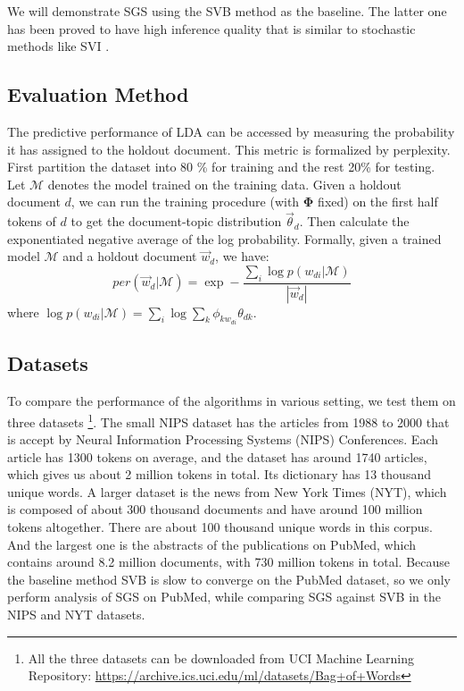 \documentclass{article} %
\begin{document}
We will demonstrate SGS using the SVB method \cite{broderick2013streaming} as the baseline. The latter one has been proved to have high inference quality that is similar to stochastic methods like SVI \cite{hoffman2013stochastic}. 

\subsection{Evaluation Method}
The predictive performance of LDA can be accessed by measuring the probability it has assigned to the holdout document. This metric is formalized by perplexity. First partition the dataset into 80 \% for training and the rest 20\% for testing. Let $\mathcal{M}$ denotes the model trained on the training data. Given a holdout document $d$, we can run the training procedure (with $\bm{\Phi}$ fixed) on the first half tokens of $d$ to get the document-topic distribution $\vec{\theta}_d$. Then calculate the exponentiated negative average of the log probability. Formally, given a trained model $\mathcal{M}$ and a holdout document $\vec{w}_{d}$, we have:
$$per(\vec{w}_{d}|\mathcal{M})=\exp-\frac{\sum_i \log p(w_{di}|\mathcal{M})}{|\vec{w}_{d}|}$$
where $\log p(w_{di}|\mathcal{M})=\sum_i \log {\sum_k \phi_{kw_{di}}\theta_{dk}}$. 

\subsection{Datasets}
To compare the performance of the algorithms in various setting, we test them on three datasets \footnote{All the three datasets can be downloaded from UCI Machine Learning Repository: \url{https://archive.ics.uci.edu/ml/datasets/Bag+of+Words}}. The small NIPS dataset \cite{pereiraeuclidean} has the articles from 1988 to 2000 that is accept by Neural Information Processing Systems (NIPS) Conferences. Each article has 1300 tokens on average, and the dataset has around 1740 articles, which gives us about 2 million tokens in total. Its dictionary has 13 thousand unique words. A larger dataset is the news from New York Times (NYT), which is composed of about 300 thousand documents and have around 100 million tokens altogether. There are about 100 thousand unique words in this corpus. And the largest one is the abstracts of the publications on PubMed, which contains around 8.2 million documents, with 730 million tokens in total\cite{UCI+Bache+Lichman:2013}. Because the baseline method SVB is slow to converge on the PubMed dataset, so we only perform analysis of SGS on PubMed, while comparing SGS against SVB in the NIPS and NYT datasets.
\end{document}
